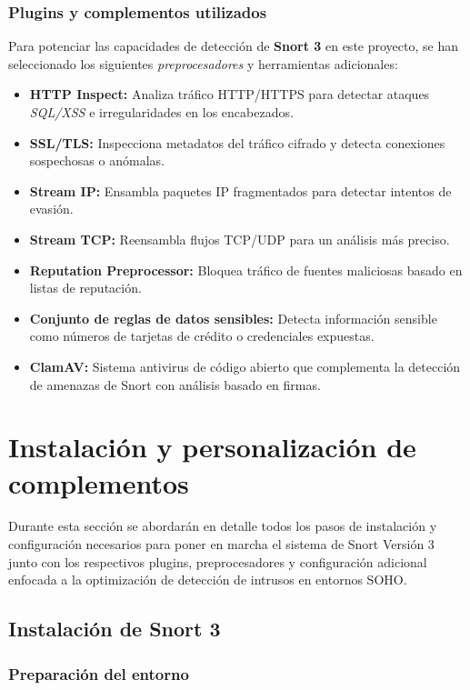 \documentclass[11pt,a4paper,twoside]{report}
\begin{document}
\subsubsection{Plugins y complementos utilizados}
Para potenciar las capacidades de detección de \textbf{Snort 3} en este proyecto, se han seleccionado los siguientes \textit{preprocesadores} y herramientas adicionales:

\begin{itemize}
	\item \textbf{HTTP Inspect:} Analiza tráfico HTTP/HTTPS para detectar ataques \textit{SQL/XSS} e irregularidades en los encabezados.
	\item \textbf{SSL/TLS:} Inspecciona metadatos del tráfico cifrado y detecta conexiones sospechosas o anómalas.
	\item \textbf{Stream IP:} Ensambla paquetes IP fragmentados para detectar intentos de evasión.
	\item \textbf{Stream TCP:} Reensambla flujos TCP/UDP para un análisis más preciso.
	\item \textbf{Reputation Preprocessor:} Bloquea tráfico de fuentes maliciosas basado en listas de reputación. 
	\item \textbf{Conjunto de reglas de datos sensibles:} Detecta información sensible como números de tarjetas de crédito o credenciales expuestas.
	\item \textbf{ClamAV:} Sistema antivirus de código abierto que complementa la detección de amenazas de Snort con análisis basado en firmas.
\end{itemize}


\newpage

\section{Instalación y personalización de complementos}

Durante esta sección se abordarán en detalle todos los pasos de instalación y configuración necesarios para poner en marcha el sistema de Snort Versión 3 junto con los respectivos plugins, preprocesadores y configuración adicional enfocada a la optimización de detección de intrusos en entornos SOHO.

\subsection{Instalación de Snort 3}

\subsubsection*{Preparación del entorno}
\end{document}
